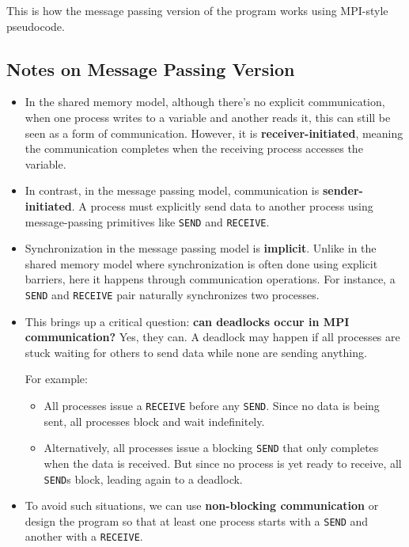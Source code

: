 \documentclass[12pt]{book}
\begin{document}
This is how the message passing version of the program works using MPI-style pseudocode.


\subsection{Notes on Message Passing Version}

\begin{itemize}
    \item In the shared memory model, although there's no explicit communication, when one process writes to a variable and another reads it, this can still be seen as a form of communication. However, it is \textbf{receiver-initiated}, meaning the communication completes when the receiving process accesses the variable.

    \item In contrast, in the message passing model, communication is \textbf{sender-initiated}. A process must explicitly send data to another process using message-passing primitives like \texttt{SEND} and \texttt{RECEIVE}.

    \item Synchronization in the message passing model is \textbf{implicit}. Unlike in the shared memory model where synchronization is often done using explicit barriers, here it happens through communication operations. For instance, a \texttt{SEND} and \texttt{RECEIVE} pair naturally synchronizes two processes.

    \item This brings up a critical question: \textbf{can deadlocks occur in MPI communication?} Yes, they can. A deadlock may happen if all processes are stuck waiting for others to send data while none are sending anything.

    For example:
    \begin{itemize}
        \item All processes issue a \texttt{RECEIVE} before any \texttt{SEND}. Since no data is being sent, all processes block and wait indefinitely.
        \item Alternatively, all processes issue a blocking \texttt{SEND} that only completes when the data is received. But since no process is yet ready to receive, all \texttt{SEND}s block, leading again to a deadlock.
    \end{itemize}

    \item To avoid such situations, we can use \textbf{non-blocking communication} or design the program so that at least one process starts with a \texttt{SEND} and another with a \texttt{RECEIVE}.


\end{itemize}
\end{document}
